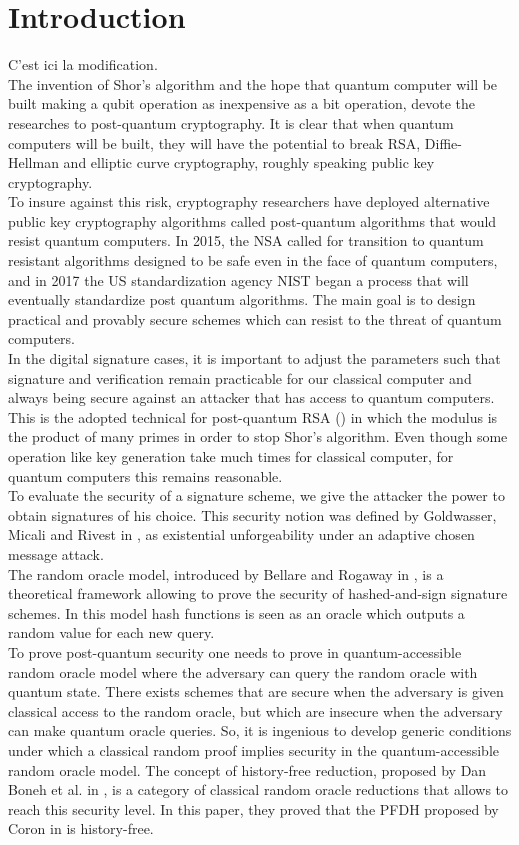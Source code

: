 \documentclass[a4paper,11pt]{article}
\begin{document}
\section{Introduction}
C'est ici la modification.\\
The invention of Shor's algorithm \cite{Shor} and the hope that quantum computer will be built making a qubit operation as inexpensive as a bit operation, devote the researches to post-quantum cryptography.
It is clear that when quantum computers will be built, they will have the potential to break RSA, Diffie-Hellman and elliptic curve cryptography, roughly speaking public key cryptography.\\
To insure against this risk, cryptography researchers have deployed alternative public key cryptography algorithms called post-quantum algorithms that would resist quantum computers. In 2015, the NSA called for transition to quantum resistant algorithms designed to be safe even in the face of quantum computers, and in 2017 the US standardization agency NIST began a process that will eventually standardize post quantum algorithms.
The main goal is to design  practical and provably secure schemes which can resist to the threat of  quantum computers.\\
In the digital signature cases, it is important to adjust the parameters such that signature and verification remain practicable for our classical computer and always being secure against an attacker that has access to quantum computers. This is the adopted technical for post-quantum RSA (\cite{pqRSA}) in which the modulus is the product of many primes in order to stop Shor's algorithm. Even though some operation like key generation take much times for classical computer, for quantum computers this remains reasonable.\\
To evaluate the security of a signature scheme, we give the attacker the power to obtain signatures of his choice. This security notion was defined by Goldwasser,  Micali and Rivest in \cite{Goldwasser}, as existential unforgeability under an adaptive chosen message attack.\\
The random oracle model, introduced by Bellare and Rogaway in \cite{Bellare1}, is a theoretical framework allowing to prove the security of hashed-and-sign signature schemes. In this model hash functions is seen as an oracle which outputs a random value for each new query.\\
To prove post-quantum security one needs to prove in quantum-accessible random oracle model where the adversary can query the random oracle with quantum state. There exists schemes that are secure when the adversary is given classical access to the random oracle, but which are insecure when the adversary can make quantum oracle queries. So, it is ingenious to develop generic conditions under which a classical random proof implies security in the quantum-accessible random oracle model. The concept of history-free reduction, proposed by Dan Boneh et al. in \cite{pqROM}, is a category of classical random oracle reductions that allows to reach this security level. In this paper, they proved that the PFDH proposed by Coron in \cite{Coron-FDH} is history-free.
\end{document}
